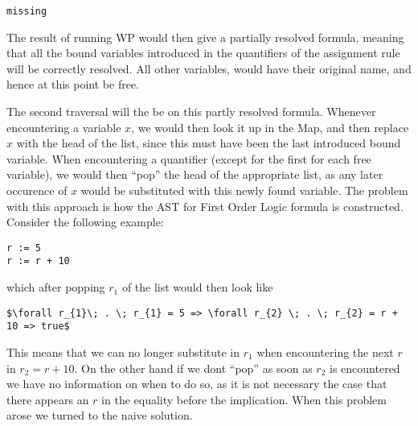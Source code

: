 \begin{lstlisting}
missing
\end{lstlisting}

The result of running WP would then give a partially resolved formula, meaning that all the bound variables introduced in the quantifiers of the assignment rule will be correctly resolved. All other variables, would have their original name, and hence at this point be free.

The second traversal will the be on this partly resolved formula. Whenever encountering a variable $x$, we would then look it up in the Map, and then replace $x$ with the head of the list, since this must have been the last introduced bound variable. When encountering a quantifier (except for the first for each free variable), we would then ``pop'' the head of the appropriate list, as any later occurence of $x$ would be substituted with this newly found variable. The problem with this approach is how the AST for First Order Logic formula is constructed. Consider the following example:
\begin{lstlisting}
r := 5
r := r + 10
\end{lstlisting}
which after popping $r_{1}$ of the list would then look like
\begin{lstlisting}[mathescape=true]
$\forall r_{1}\; . \; r_{1} = 5 => \forall r_{2} \; . \; r_{2} = r + 10 => true$
\end{lstlisting}
This means that we can no longer substitute in $r_{1}$ when encountering the next $r$ in $r_{2} = r + 10$. On the other hand if we dont ``pop'' as soon as $r_{2}$ is encountered we have no information on when to do so, as it is not necessary the case that there appears an $r$ in the equality before the implication. When this problem arose we turned to the naive solution.

